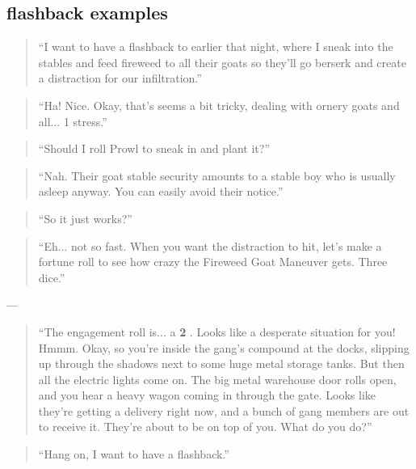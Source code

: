 \documentclass[11pt,fleqn,a5paper]{book}
\newcommand{\gameterm}[1]{\textbf{#1}}
\begin{document}
\subsection{flashback examples}

\begin{quote}
	“I want to have a flashback to earlier that night, where I sneak into the stables and feed fireweed to all their goats so they’ll go berserk and create a distraction for our infiltration.”
\end{quote} 

\begin{quote}
	“Ha! Nice. Okay, that’s seems a bit tricky, dealing with ornery goats and all... 1 stress.”
\end{quote} 

\begin{quote}
	“Should I roll Prowl to sneak in and plant it?”
\end{quote} 

\begin{quote}
	“Nah. Their goat stable security amounts to a stable boy who is usually asleep anyway. You can easily avoid their notice.”
\end{quote} 

\begin{quote}
	“So it just works?”
\end{quote} 

\begin{quote}
	“Eh... not so fast. When you want the distraction to hit, let’s make a fortune roll to see how crazy the Fireweed Goat Maneuver gets. Three dice.”
\end{quote} 

---

\begin{quote}
	“The engagement roll is... a \gameterm{2} . Looks like a desperate situation for you! Hmmm. Okay, so you’re inside the gang’s compound at the docks, slipping up through the shadows next to some huge metal storage tanks. But then all the electric lights come on. The big metal warehouse door rolls open, and you hear a heavy wagon coming in through the gate. Looks like they’re getting a delivery right now, and a bunch of gang members are out to receive it. They’re about to be on top of you. What do you do?”
\end{quote} 

\begin{quote}
	“Hang on, I want to have a flashback.”
\end{quote} 
\end{document}
